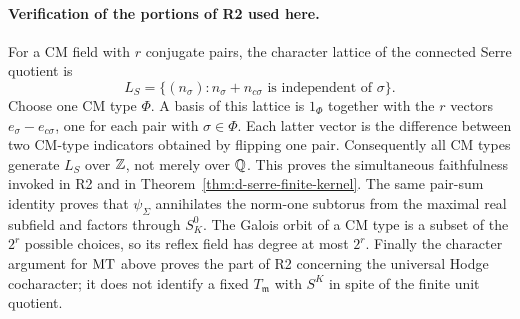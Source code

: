 \paragraph{Verification of the portions of R2 used here.}
For a CM field with $r$ conjugate pairs, the character lattice of
the connected Serre quotient is
\citep[\S1, equations (1.1)--(1.3)]{DMilneShih1982}
\[
 L_S=\{(n_\sigma): n_\sigma+n_{c\sigma}
                            \text{ is independent of }\sigma\}.
\]
Choose one CM type $\Phi$.  A basis of this lattice is $1_\Phi$
together with the $r$ vectors $e_\sigma-e_{c\sigma}$, one for each
pair with $\sigma\in\Phi$.  Each latter vector is the difference
between two CM-type indicators obtained by flipping one pair.
Consequently all CM types generate $L_S$ over $\mathbb Z$, not merely
over $\mathbb Q$.  This proves the simultaneous faithfulness invoked in
R2 and in Theorem~\ref{thm:d-serre-finite-kernel}.  The same pair-sum
identity proves that $\psi_\Sigma$ annihilates the norm-one subtorus
from the maximal real subfield and factors through $S_K^0$.
The Galois orbit of a CM type is a subset of the $2^r$ possible
choices, so its reflex field has degree at most $2^r$.  Finally the
character argument for $\operatorname{MT}$ above proves the part of R2 concerning
the universal Hodge cocharacter; it does not identify a fixed
$T_{\mathfrak m}$ with $S^K$ in spite of the finite unit quotient.
